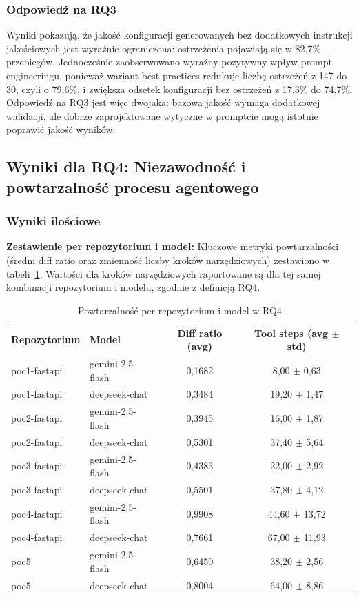 \subsubsection{Odpowiedź na RQ3}

Wyniki pokazują, że jakość konfiguracji generowanych bez dodatkowych instrukcji jakościowych jest wyraźnie ograniczona: ostrzeżenia pojawiają się w 82{,}7\% przebiegów. Jednocześnie zaobserwowano wyraźny pozytywny wpływ prompt engineeringu, ponieważ wariant best practices redukuje liczbę ostrzeżeń z 147 do 30, czyli o 79{,}6\%, i zwiększa odsetek konfiguracji bez ostrzeżeń z 17{,}3\% do 74{,}7\%. Odpowiedź na RQ3 jest więc dwojaka: bazowa jakość wymaga dodatkowej walidacji, ale dobrze zaprojektowane wytyczne w promptcie mogą istotnie poprawić jakość wyników.

\subsection{Wyniki dla RQ4: Niezawodność i powtarzalność procesu agentowego}

\subsubsection{Wyniki ilościowe}

\textbf{Zestawienie per repozytorium i model:} Kluczowe metryki powtarzalności (średni diff ratio oraz zmienność liczby kroków narzędziowych) zestawiono w tabeli~\ref{tab:h4-repeatability}. Wartości dla kroków narzędziowych raportowane są dla tej samej kombinacji repozytorium i modelu, zgodnie z definicją RQ4.

\begin{table}[h]
    \centering
    \begin{tabular}{llcc}
        \textbf{Repozytorium} & \textbf{Model} & \textbf{Diff ratio (avg)} & \textbf{Tool steps (avg $\pm$ std)} \\
        poc1-fastapi & gemini-2.5-flash & 0{,}1682 & 8{,}00 $\pm$ 0{,}63 \\
        poc1-fastapi & deepseek-chat & 0{,}3484 & 19{,}20 $\pm$ 1{,}47 \\
        poc2-fastapi & gemini-2.5-flash & 0{,}3945 & 16{,}00 $\pm$ 1{,}87 \\
        poc2-fastapi & deepseek-chat & 0{,}5301 & 37{,}40 $\pm$ 5{,}64 \\
        poc3-fastapi & gemini-2.5-flash & 0{,}4383 & 22{,}00 $\pm$ 2{,}92 \\
        poc3-fastapi & deepseek-chat & 0{,}5501 & 37{,}80 $\pm$ 4{,}12 \\
        poc4-fastapi & gemini-2.5-flash & 0{,}9908 & 44{,}60 $\pm$ 13{,}72 \\
        poc4-fastapi & deepseek-chat & 0{,}7661 & 67{,}00 $\pm$ 11{,}93 \\
        poc5 & gemini-2.5-flash & 0{,}6450 & 38{,}20 $\pm$ 2{,}56 \\
        poc5 & deepseek-chat & 0{,}8004 & 64{,}00 $\pm$ 8{,}86 \\
    \end{tabular}
    \caption{Powtarzalność per repozytorium i model w RQ4}
    \label{tab:h4-repeatability}
\end{table}

